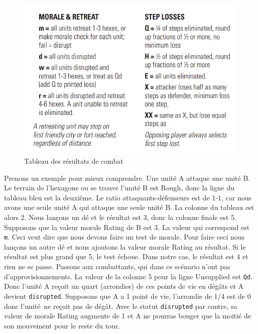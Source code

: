 \begin{figure}[H]
\centering
\includegraphics[scale=0.3]{data/morale_et_retraite.png}
\caption{Tableau des résultats de combat}
\end{figure}

Prenons un exemple pour mieux comprendre. Une unité A attaque une unité B. Le terrain de l'hexagone ou se trouve l'unité B est Rough, donc la ligne du tableau bleu est la deuxième.
Le ratio attaquants-défenseurs est de 1-1, car nous avons une seule unité A qui attaque une seule unité B. La colonne du tableau est alors 2.
Nous lançons un dé et le résultat est 3, donc la colonne finale est 5. Supposons que la valeur morale Rating de B est 3.
La valeur qui correspond est {\tt m}. Ceci veut dire que nous devons faire un test de morale.
Pour faire ceci nous lançons un autre dé et nous ajoutons la valeur morale Rating au résultat. Si le résultat est plus grand que 5, le test échoue.
Dans notre cas, le résultat est 4 et rien ne se passe. Passons aux combattants, qui dans ce scénario
n'ont pas d'approvisionnements. La valeur de la colonne 5 pour la ligne Unsupplied est {\tt Qd}.
Donc l'unité A reçoit un quart (arrondies) de ces points de vie en dégâts et A devient {\tt disrupted}.
Supposons que A a 1 point de vie, l'arrondie de 1/4 est de 0 donc l'unité ne reçoit pas de dégât.
Avec le statut {\tt disrupted} par contre, sa valeur de morale Rating augmente de 1 et A ne pourras bouger que la moitié de son mouvement pour le reste du tour.